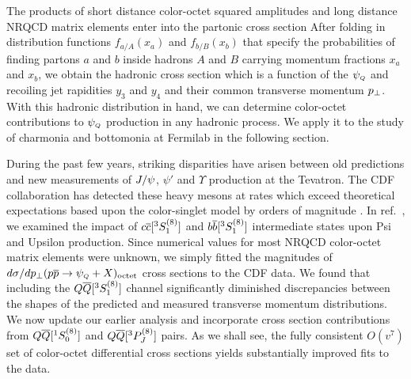	The products of short distance color-octet squared amplitudes and 
long distance NRQCD matrix elements enter into the partonic cross section
%
\eqn{}
%
After folding in distribution functions $f_{a/A}(x_a)$ and $f_{b/B}(x_b)$ 
that specify the probabilities of finding partons $a$ and $b$ inside hadrons
$A$ and $B$ carrying momentum fractions $x_a$ and $x_b$, we obtain the 
hadronic cross section
%
\eqn{}
%
which is a function of the $\psi_{\scriptscriptstyle Q}$ and recoiling jet rapidities $y_3$ and $y_4$ 
and their common transverse momentum $p_\perp$.  With this hadronic 
distribution in hand, we can determine color-octet contributions to $\psi_{\scriptscriptstyle Q}$ 
production in any hadronic process.  We apply it to the study of 
charmonia and bottomonia at Fermilab in the following section.


	During the past few years, striking disparities have arisen between 
old predictions and new measurements of $J/\psi$, $\psi'$ and $\Upsilon$ 
production at the Tevatron.  The CDF collaboration has detected these heavy 
mesons at rates which exceed theoretical 
expectations based upon the color-singlet model by orders of magnitude 
.  In ref.~\ChoLeibov, we examined the 
impact of $c{\overline c}[ ^3S_1^{(8)}]$ and $b{\overline b}[^3S_1^{(8)}]$ intermediate states upon 
Psi and Upsilon production.  Since numerical values for most 
NRQCD color-octet matrix elements were unknown, we simply fitted the 
magnitudes of $d\sigma/dp_\perp(p{\overline{p}} \to \psi_{\scriptscriptstyle Q}+X)_{\rm octet}$ cross sections to the CDF 
data.  We found that including the $Q{\overline Q}[ ^3S_1^{(8)}]$ channel significantly 
diminished discrepancies between the shapes of the predicted and measured 
transverse momentum distributions.  We now update our earlier analysis and 
incorporate cross section contributions from $Q{\overline Q}[ ^1S_0^{(8)}]$ and 
$Q{\overline Q}[ ^3P_J^{(8)}]$ pairs.  As we shall see, the fully consistent $O(v^7)$ set 
of color-octet differential cross sections yields substantially improved fits 
to the data.

